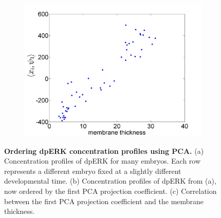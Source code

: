\documentclass[10pt]{article}
\begin{document}
\begin{figure}[H]
\begin{subfigure}{0.3\textwidth}
\includegraphics[width=\textwidth]{PCA_time_corr}
\caption{}
\end{subfigure}
\caption{{\bf Ordering dpERK concentration profiles using PCA.} (a) Concentration profiles of dpERK for many embryos. Each row represents a different embryo fixed at a slightly different developmental time.
(b) Concentration profiles of dpERK from (a), now ordered by the first PCA projection coefficient.
(c) Correlation between the first PCA projection coefficient and the membrane thickness.}
\label{fig:PCA_ordering}
\end{figure}
\end{document}

